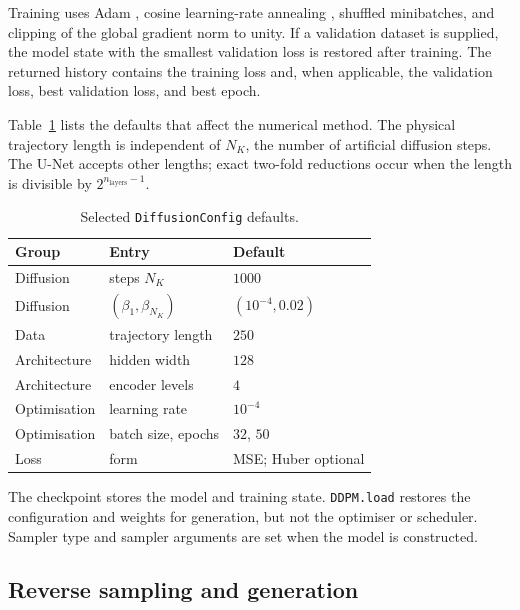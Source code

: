 Training uses Adam \cite{kingma2015adam}, cosine learning-rate annealing
\cite{loshchilov2017sgdr}, shuffled minibatches, and clipping of the global
gradient norm to unity. If a validation dataset is supplied, the model state with
the smallest validation loss is restored after training. The returned history
contains the training loss and, when applicable, the validation loss, best
validation loss, and best epoch.

Table~\ref{tab:config} lists the defaults that affect the numerical method. The
physical trajectory length is independent of $N_K$, the number of artificial
diffusion steps. The U-Net accepts other lengths; exact two-fold reductions occur
when the length is divisible by $2^{n_{\mathrm{layers}}-1}$.

\begin{table}[t]
  \centering
  \caption{Selected \texttt{DiffusionConfig} defaults.}
  \label{tab:config}
  \small
  \begin{tabular}{@{}lll@{}}
    \toprule
    Group & Entry & Default \\
    \midrule
    Diffusion & steps $N_K$ & $1000$ \\
    Diffusion & $(\beta_1,\beta_{N_K})$ & $(10^{-4},0.02)$ \\
    Data & trajectory length & $250$ \\
    Architecture & hidden width & $128$ \\
    Architecture & encoder levels & $4$ \\
    Optimisation & learning rate & $10^{-4}$ \\
    Optimisation & batch size, epochs & $32$, $50$ \\
    Loss & form & MSE; Huber optional \\
    \bottomrule
  \end{tabular}
\end{table}

The checkpoint stores the model and training state. \texttt{DDPM.load} restores
the configuration and weights for generation, but not the optimiser or scheduler.
Sampler type and sampler arguments are set when the model is constructed.

\subsection{Reverse sampling and generation}
\label{ssec:generate}

